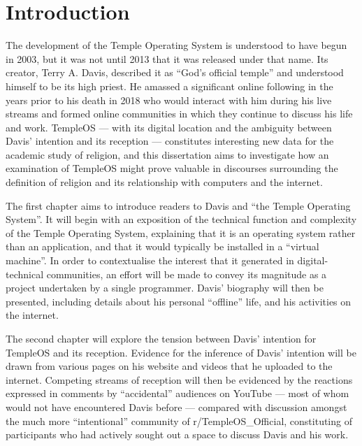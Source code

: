 \documentclass[Draft.tex]{subfiles}
\begin{document}
\chapter*{Introduction}

The development of the Temple Operating System\footnotemark\thinspace
is understood to have begun in 2003,
but it was not until 2013 that it was released under that name.
Its creator, Terry A. Davis, described it as ``God's official temple''
and understood himself to be its high priest.
He amassed a significant online following
in the years prior to his death in 2018
who would interact with him during his live streams
and formed online communities
in which they continue to discuss his life and work.
TempleOS --- with its digital location and the ambiguity between
Davis' intention and its reception --- constitutes interesting new data
for the academic study of religion,
and this dissertation aims to investigate how
an examination of TempleOS might prove valuable
in discourses surrounding the definition of religion
and its relationship with computers and the internet.


The first chapter aims to introduce readers to Davis and ``the Temple
Operating System''.
It will begin with an exposition of the technical function
and complexity of the Temple Operating System,
explaining that it is an operating system rather than an application,
and that it would typically be installed in a ``virtual machine''.
In order to contextualise the interest that it generated
in digital-technical communities, an effort will be made to convey
its magnitude as a project undertaken by a single programmer.
Davis' biography will then be presented, including details about his
personal ``offline'' life, and his activities on the internet.

The second chapter will explore the tension between
Davis' intention for TempleOS and its reception.
Evidence for the inference of Davis' intention will be drawn from
various pages on his website and videos that he uploaded to the internet.
Competing streams of reception will then be evidenced
by the reactions expressed in comments by ``accidental'' audiences on YouTube ---
most of whom would not have encountered Davis before ---
compared with discussion amongst the much more ``intentional''
community of r/TempleOS\_Official, constituting of participants who had
actively sought out a space to discuss Davis and his work.
\end{document}
